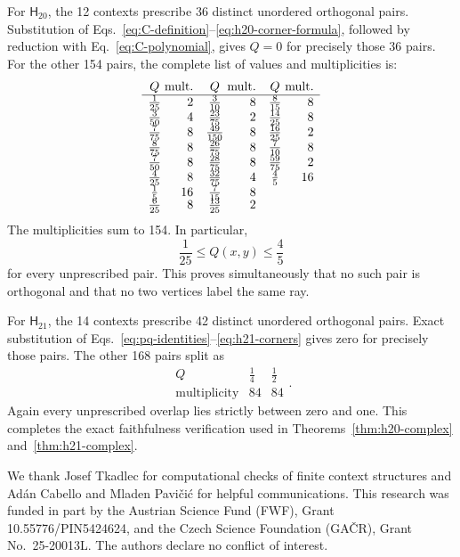 \documentclass[twocolumn,aps,pra,floatfix,amsmath,amssymb,longbibliography]{revtex4-2}
\theoremstyle{definition}
\theoremstyle{remark}
\newcommand{\Htwenty}{\mathsf H_{20}}
\newcommand{\Htwentyone}{\mathsf H_{21}}
\begin{document}
For $\Htwenty$, the 12 contexts prescribe 36 distinct unordered
orthogonal pairs.  Substitution of
Eqs.~\eqref{eq:C-definition}--\eqref{eq:h20-corner-formula}, followed by
reduction with Eq.~\eqref{eq:C-polynomial}, gives $Q=0$ for precisely
those 36 pairs.  For the other 154 pairs, the complete list of values
and multiplicities is:
\begin{equation}
\begin{array}{c@{\;}r@{\quad}c@{\;}r@{\quad}c@{\;}r}
 Q&\text{mult.}&Q&\text{mult.}&Q&\text{mult.}\\ \hline
 \frac1{25}&2&\frac3{10}&8&\frac8{15}&8\\
 \frac3{50}&4&\frac{23}{75}&2&\frac{14}{25}&8\\
 \frac7{75}&8&\frac{49}{150}&8&\frac{16}{25}&2\\
 \frac8{75}&8&\frac{26}{75}&8&\frac7{10}&8\\
 \frac7{50}&8&\frac{28}{75}&8&\frac{59}{75}&2\\
 \frac4{25}&8&\frac{32}{75}&4&\frac45&16\\
 \frac15&16&\frac7{15}&8&&\\[-2pt]
 \frac6{25}&8&\frac{13}{25}&2&&
\end{array}
\label{eq:H20-Q-table}
\end{equation}
The multiplicities sum to 154.  In particular,
\begin{equation}
 \frac1{25}\le Q(x,y)\le\frac45
 \label{eq:H20-Q-bounds}
\end{equation}
for every unprescribed pair.  This proves simultaneously that no such
pair is orthogonal and that no two vertices label the same ray.

For $\Htwentyone$, the 14 contexts prescribe 42 distinct unordered
orthogonal pairs.  Exact substitution of
Eqs.~\eqref{eq:pq-identities}--\eqref{eq:h21-corners} gives zero for
precisely those pairs.  The other 168 pairs split as
\begin{equation}
 \begin{array}{c|cc}
 Q&\frac14&\frac12\\ \hline
 \text{multiplicity}&84&84
 \end{array}.
 \label{eq:H21-Q-table}
\end{equation}
Again every unprescribed overlap lies strictly between zero and one.
This completes the exact faithfulness verification used in
Theorems~\ref{thm:h20-complex} and~\ref{thm:h21-complex}.

\begin{acknowledgments}
We thank Josef Tkadlec for computational checks of finite context
structures and Ad\'{a}n Cabello and Mladen Pavi\v{c}i\'{c} for helpful
communications.  This research was funded in part by the Austrian
Science Fund (FWF), Grant 10.55776/PIN5424624, and the Czech Science
Foundation (GA\v{C}R), Grant No.~25-20013L.  The authors declare no
conflict of interest.
\end{acknowledgments}


\end{document}
